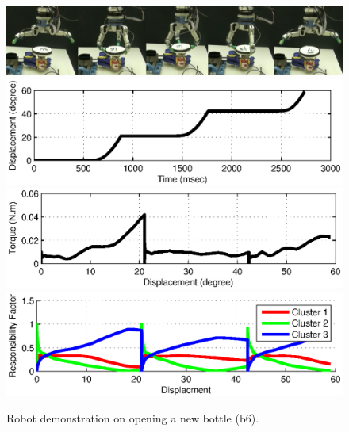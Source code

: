 \begin{figure}
  \centering
  \includegraphics[width=15cm]{./fig/demo_b6.jpg}
  \includegraphics[width=15cm]{./fig/demo_b6_s.eps}
  \includegraphics[width=15cm]{./fig/demo_b6_T.eps}
  \includegraphics[width=15cm]{./fig/demo_b6_rf.eps}
  \caption{ \scriptsize{Robot demonstration on opening a new bottle (b6).}
}
\label{fig:demo_b6}
\end{figure}







